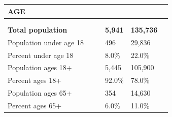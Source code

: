 \documentclass[9pt]{report}
\begin{document}
\vspace{24pt}
\setlength{\tabcolsep}{.01in} %
\begin{tabular}{p{.10in}p{.10in}p{.10in}p{3.7in}>{\hfill}p{.85in}>{\hfill}p{.85in}>{\hfill}p{.85in}>{\hfill}p{.85in}p{0.1in}}
\multicolumn{9}{l}{\parbox{7.1in}{\raggedright{\large{\strut\textbf{AGE}\strut}}}} \\ 
\hline
\multicolumn{4}{l}{\parbox{3.5in}{\raggedright{\textbf{}}}} & \multicolumn{1}{r}{\parbox{.85in}{\strut\raggedleft{\textbf{}\strut}}} & \multicolumn{1}{r}{\parbox{.85in}{\strut\raggedleft{\textbf{}\strut}}} & \multicolumn{1}{r}{\parbox{.85in}{\strut{}}} & \multicolumn{1}{r}{\parbox{.85in}{\strut{}}} & \\ 
\multicolumn{9}{l}{} \\ 
\multicolumn{4}{l}{\parbox{3.5in}{\strut\raggedright{\textbf{Total population}\strut}}} & \textbf{} & \textbf{} & \textbf{5,941} & \textbf{135,736} & \textbf{} \\ 
\multicolumn{4}{l}{\parbox{3.6in}{\strut\raggedright{{Population under age 18}}\strut}} &  &  & 496 & 29,836 & \multicolumn{1}{l}{}  \\ 
\multicolumn{4}{l}{\parbox{3.6in}{\strut\raggedright{{Percent under age 18}}\strut}} &  &  & 8.0\% & 22.0\% & \multicolumn{1}{l}{}  \\ 
\multicolumn{4}{l}{\parbox{3.6in}{\strut\raggedright{{Population ages 18+}}\strut}} &  &  & 5,445 & 105,900 & \multicolumn{1}{l}{}  \\ 
\multicolumn{4}{l}{\parbox{3.6in}{\strut\raggedright{{Percent ages 18+}}\strut}} &  &  & 92.0\% & 78.0\% & \multicolumn{1}{l}{}  \\ 
\multicolumn{4}{l}{\parbox{3.6in}{\strut\raggedright{{Population ages 65+}}\strut}} &  &  & 354 & 14,630 & \multicolumn{1}{l}{}  \\ 
\multicolumn{4}{l}{\parbox{3.6in}{\strut\raggedright{{Percent ages 65+}}\strut}} &  &  & 6.0\% & 11.0\% & \multicolumn{1}{l}{}  \\ 

\end{tabular}
\setlength{\tabcolsep}{6pt} %
\end{document}
